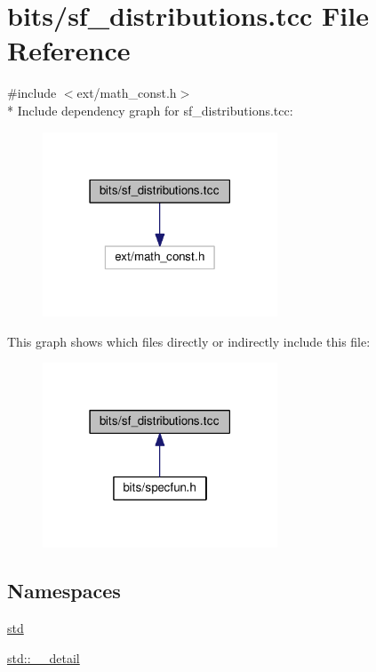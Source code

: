\hypertarget{sf__distributions_8tcc}{}\section{bits/sf\+\_\+distributions.tcc File Reference}
\label{sf__distributions_8tcc}
{\ttfamily \#include $<$ext/math\+\_\+const.\+h$>$}\\*
Include dependency graph for sf\+\_\+distributions.\+tcc\+:
\nopagebreak
\begin{figure}[H]
\begin{center}
\leavevmode
\includegraphics[width=198pt]{sf__distributions_8tcc__incl}
\end{center}
\end{figure}
This graph shows which files directly or indirectly include this file\+:
\nopagebreak
\begin{figure}[H]
\begin{center}
\leavevmode
\includegraphics[width=198pt]{sf__distributions_8tcc__dep__incl}
\end{center}
\end{figure}
\subsection*{Namespaces}
\begin{DoxyCompactItemize}
\item 
 \hyperlink{namespacestd}{std}
\item 
 \hyperlink{namespacestd_1_1____detail}{std\+::\+\_\+\+\_\+detail}
\end{DoxyCompactItemize}
